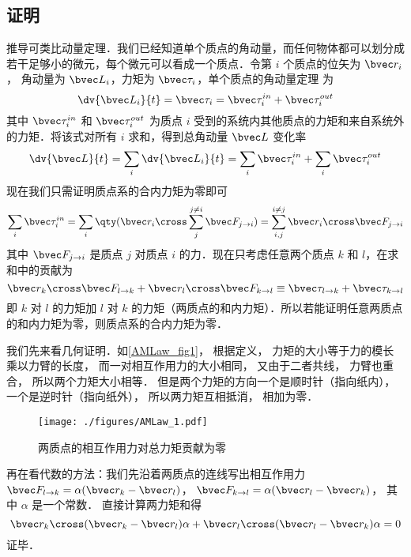 
\subsection{证明}
推导可类比动量定理．我们已经知道单个质点的角动量，而任何物体都可以划分成若干足够小的微元，每个微元可以看成一个质点．令第 $i$ 个质点的位矢为 $\bvec r_i$， 角动量为 $\bvec L_i$，力矩为 $\bvec \tau_i$，单个质点的角动量定理 为
\begin{equation}
\dv{\bvec L_i}{t} = \bvec \tau_i = \bvec \tau_i^{in} + \bvec \tau_i^{out}
\end{equation}
其中 $\bvec \tau_i^{in}$ 和 $\bvec \tau_i^{out}$ 为质点 $i$ 受到的系统内其他质点的力矩和来自系统外的力矩．将该式对所有 $i$ 求和，得到总角动量 $\bvec L$ 变化率
\begin{equation}
\dv{\bvec L}{t} =\sum_i\dv{\bvec L_i}{t} = \sum_i\bvec \tau_i^{in} + \sum_i\bvec \tau_i^{out}
\end{equation}
现在我们只需证明质点系的合内力矩为零即可
\begin{equation}
\sum_i\bvec \tau_i^{in} = \sum_i \qty(\bvec r_i\cross\sum_j^{j\ne i}\bvec F_{j\to i}) = \sum_{i,j}^{i\ne j} \bvec r_i\cross\bvec F_{j\to i}
\end{equation}
其中 $\bvec F_{j\to i}$ 是质点 $j$ 对质点 $i$ 的力．现在只考虑任意两个质点 $k$ 和 $l$，在求和中的贡献为
\begin{equation}
\bvec r_k\cross\bvec F_{l\to k} + \bvec r_l\cross\bvec F_{k\to l} \equiv \bvec \tau_{l\to k}+ \bvec \tau_{k\to l}
\end{equation}
即 $k$ 对 $l$ 的力矩加 $l$ 对 $k$ 的力矩（两质点的和内力矩）．所以若能证明任意两质点的和内力矩为零，则质点系的合内力矩为零．

我们先来看几何证明．如\autoref{AMLaw_fig1}， 根据定义， 力矩的大小等于力的模长乘以力臂的长度， 而一对相互作用力的大小相同， 又由于二者共线， 力臂也重合， 所以两个力矩大小相等． 但是两个力矩的方向一个是顺时针（指向纸内）， 一个是逆时针（指向纸外）， 所以两力矩互相抵消， 相加为零．

\begin{figure}[ht]
\centering
\texttt{[image: ./figures/AMLaw\_1.pdf]}
\caption{两质点的相互作用力对总力矩贡献为零}\label{AMLaw_fig1}
\end{figure}

再在看代数的方法：我们先沿着两质点的连线写出相互作用力 $\bvec F_{l\to k} = \alpha(\bvec r_k - \bvec r_l)$， $\bvec F_{k\to l} = \alpha(\bvec r_l - \bvec r_k)$， 其中 $\alpha$ 是一个常数． 直接计算两力矩和得
\begin{equation}
\bvec r_k \cross (\bvec r_k - \bvec r_l)\alpha + \bvec r_l \cross (\bvec r_l - \bvec r_k)\alpha = 0
\end{equation}
证毕．
